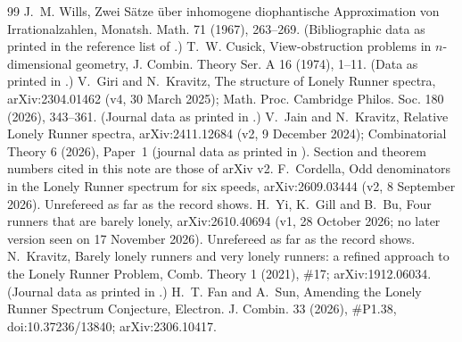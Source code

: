 \documentclass[11pt]{amsart}
\theoremstyle{definition}
\theoremstyle{remark}
\begin{document}
\begin{thebibliography}{99}
 J.~M. Wills, Zwei S\"atze \"uber inhomogene diophantische Approximation von Irrationalzahlen, Monatsh. Math. 71 (1967), 263--269. (Bibliographic data as printed in the reference list of \cite{Cordella}.)
 T.~W. Cusick, View-obstruction problems in $n$-dimensional geometry, J. Combin. Theory Ser. A 16 (1974), 1--11. (Data as printed in \cite{Cordella}.)
 V.~Giri and N.~Kravitz, The structure of Lonely Runner spectra, arXiv:2304.01462 (v4, 30 March 2025); Math. Proc. Cambridge Philos. Soc. 180 (2026), 343--361. (Journal data as printed in \cite{Cordella}.)
 V.~Jain and N.~Kravitz, Relative Lonely Runner spectra, arXiv:2411.12684 (v2, 9 December 2024); Combinatorial Theory 6 (2026), Paper~1 (journal data as printed in \cite{YGB}). Section and theorem numbers cited in this note are those of arXiv v2.
 F.~Cordella, Odd denominators in the Lonely Runner spectrum for six speeds, arXiv:2609.03444 (v2, 8 September 2026). Unrefereed as far as the record shows.
 H.~Yi, K.~Gill and B.~Bu, Four runners that are barely lonely, arXiv:2610.40694 (v1, 28 October 2026; no later version seen on 17 November 2026). Unrefereed as far as the record shows.
 N.~Kravitz, Barely lonely runners and very lonely runners: a refined approach to the Lonely Runner Problem, Comb. Theory 1 (2021), \#17; arXiv:1912.06034. (Journal data as printed in \cite{Cordella}.)
 H.~T. Fan and A.~Sun, Amending the Lonely Runner Spectrum Conjecture, Electron. J. Combin. 33 (2026), \#P1.38, doi:10.37236/13840; arXiv:2306.10417.
\end{thebibliography}
\end{document}
